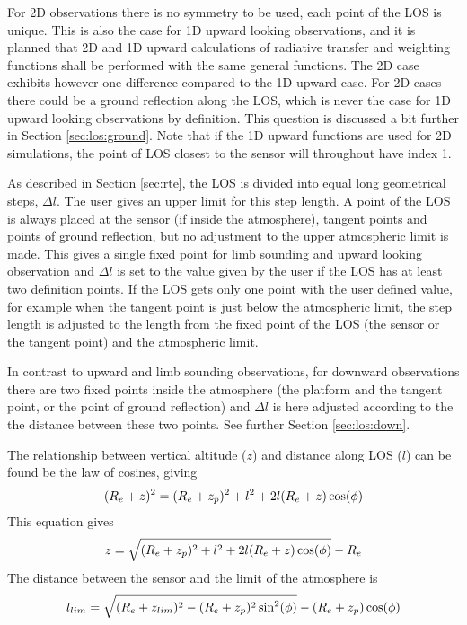  For 2D observations there is no symmetry to be used, each point of
 the LOS is unique. This is also the case for 1D upward looking
 observations, and it is planned that 2D and 1D upward calculations of
 radiative transfer and weighting functions shall be performed with
 the same general functions.  The 2D case exhibits however one
 difference compared to the 1D upward case. For 2D cases there could
 be a ground reflection along the LOS, which is never the case for 1D
 upward looking observations by definition. This question is discussed
 a bit further in Section \ref{sec:los:ground}. Note that if the 1D
 upward functions are used for 2D simulations, the point of LOS
 closest to the sensor will throughout have index 1.


 
 \label{sec:rte:stepl}
 
 As described in Section \ref{sec:rte}, the LOS is divided into equal
 long geometrical steps, $\Delta l$. The user gives an upper limit for
 this step length. A point of the LOS is always placed at the sensor
 (if inside the atmosphere), tangent points and points of ground
 reflection, but no adjustment to the upper atmospheric limit is made.
 This gives a single fixed point for limb sounding and upward looking
 observation and $\Delta l$ is set to the value given by the user if
 the LOS has at least two definition points. If the LOS gets only one
 point with the user defined value, for example when the tangent point
 is just below the atmospheric limit, the step length is adjusted to
 the length from the fixed point of the LOS (the sensor or the tangent 
 point) and the atmospheric limit.
 
 In contrast to upward and limb sounding observations, for downward
 observations there are two fixed points inside the atmosphere (the
 platform and the tangent point, or the point of ground reflection)
 and $\Delta l$ is here adjusted according to the the distance between
 these two points. See further Section \ref{sec:los:down}.



  
  \label{sec:los:up}
  
  The relationship between vertical altitude ($z$) and distance along
  LOS ($l$) can be found be the law of cosines, giving
  \begin{equation}
    (R_e+z)^2 = (R_e+z_p)^2 + l^2 + 2l(R_e+z)\cos(\phi)
  \end{equation}
  This equation gives
  \begin{equation}
    z = \sqrt{ (R_e+z_p)^2 + l^2 + 2l(R_e+z)\cos(\phi) } - R_e
  \end{equation}
  The distance between the sensor and the limit of the atmosphere is
  \begin{equation}
      l_{lim} = \sqrt{ (R_e+z_{lim})^2 - (R_e+z_p)^2\sin^2(\phi) } - 
                                       (R_e+z_p)\cos(\phi)
  \end{equation}


